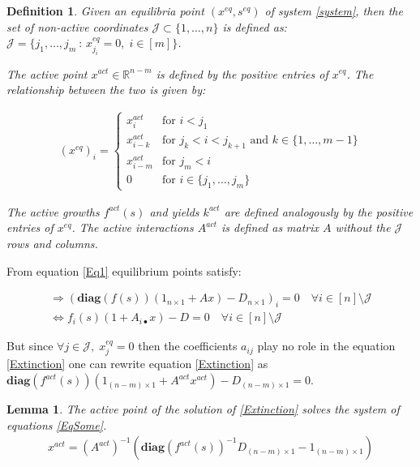 \documentclass[3p,times]{elsarticle}
\newcommand{\R}{\mathbb{R}}
\newcommand{\diag}{\textbf{diag}}
\newtheorem{defn}{Definition}
\newtheorem{lemma}{Lemma}
\begin{document}
\begin{defn}
	Given an equilibria point $(x^{eq},s^{eq})$ of system \eqref{system}, then the set of non-active coordinates $\mathcal{J}\subset \{1,\dots,n\}$ is defined as:
	$\mathcal{J} = \{j_1, \dots, j_m\ : \, x^{eq}_{j_i} = 0 , \;i \in [m] \} $.
	
	The active point $x^{act}\in \R^{n-m}$ is defined by the positive entries of $x^{eq}$. The relationship between the two is given by:
	
	\begin{align}\label{EquilibriaFormula} (x^{eq})_i = \begin{cases}
	x^{act}_i & \text{for } i < j_1\\
	x^{act}_{i-k} & \text{for } j_{k}< i <j_{k+1}  \text{ and } k \in \{1,\dots,m-1\}\\
	x^{act}_{i-m} & \text{for } j_{m}< i \\
	0 & \text{for } i \in \{j_1, \dots, j_m\}
	\end{cases} \end{align}	
	
	The active growths $f^{act}(s)$ and yields $k^{act}$ are defined analogously by the positive entries of $x^{eq}$. The active interactions $A^{act}$ is defined as matrix $A$ without the $\mathcal{J}$ rows and columns.
\end{defn}

From equation \eqref{Eq1} equilibrium points satisfy: 

\begin{align}
\Rightarrow  (\diag (f(s))(1_{n\times 1}+ Ax) - D_{n\times 1})_i = 0 \quad \forall i \in [n]\setminus \mathcal{J} \\
\Leftrightarrow f_i(s)(1 + A_{i\bullet}x) - D = 0 \quad \forall i \in [n]\setminus \mathcal{J} \label{Extinction}
\end{align} 

But since $\forall j \in \mathcal{J}, \; x^{eq}_j = 0 $ then the coefficients $a_{ij}$ play no role in the equation \eqref{Extinction} one can rewrite equation \eqref{Extinction} as $\diag(f^{act}(s))(1_{(n-m)\times 1} + A^{act}x^{act}) - D_{(n-m) \times 1}=0 $.

\begin{lemma} 
	The active point of the solution of \eqref{Extinction} solves the system of equations \eqref{EqSome}. 
	\begin{align}
	\label{EqSome}x^{act} = (A^{act})^{-1}(\diag(f^{act}(s))^{-1}D_{(n-m)\times 1} - 1_{(n-m)\times 1})
	\end{align} 
\end{lemma} 
\end{document}
